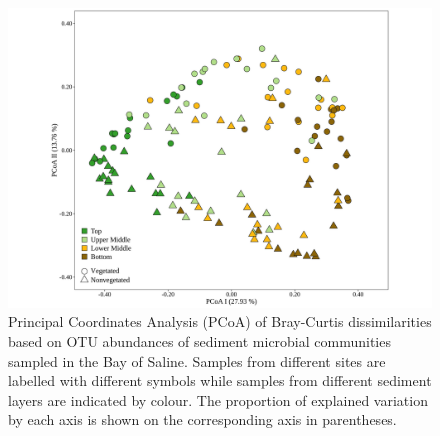 \documentclass[12pt,]{article}
\begin{document}
\begin{figure}[H]

{\centering \includegraphics[width=0.9\linewidth]{../results/figures/pcoa_figure} 

}

\caption{Principal Coordinates Analysis (PCoA) of Bray-Curtis dissimilarities based on OTU abundances of sediment microbial communities sampled in the Bay of Saline. Samples from different sites are labelled with different symbols while samples from different sediment layers are indicated by colour. The proportion of explained variation by each axis is shown on the corresponding axis in parentheses.\label{pcoa_figure}}\label{fig:unnamed-chunk-3}
\end{figure}
\end{document}
